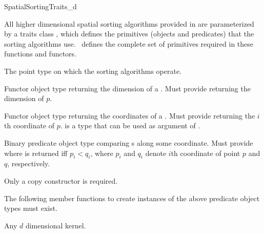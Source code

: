

\begin{ccRefConcept}{SpatialSortingTraits_d}

\ccDefinition
  
All higher dimensional spatial sorting algorithms provided in \cgal{} are parameterized
by a traits class , which defines the
primitives (objects and predicates) that the sorting algorithms use.
\ccRefName\ defines the complete set of primitives required in these
functions and functors.

\ccTypes
\ccAutoIndexingOff
{}

%
       {The point type on which the sorting algorithms operate.
       }


%
       {Functor object type returning the dimension of a  .
       Must provide 
          returning the dimension of $p$. 
       }

%
       {Functor object type returning the coordinates of a  .
       Must provide 
          returning the $i$th
        coordinate of $p$.  is a type that can be used as
        argument of .
       }


%
       {Binary predicate object type comparing s
        along some coordinate.
        Must provide 
         where 
        is returned iff $p_i < q_i$,
        where $p_i$ and $q_i$ denote $i$th coordinate of point $p$ and $q$,
        respectively.
       }

\ccCreation
{}  %

Only a copy constructor is required.


\ccOperations

The following member functions to create instances of the above predicate
object types must exist. 

\setlength\parskip{0mm}

\ccParDims
\ccHasModels

Any \cgal{} $d$ dimensional kernel.

\ccParDims
\end{ccRefConcept}


